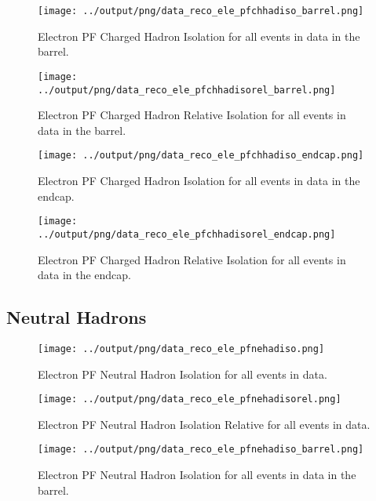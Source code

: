 \documentclass[11pt]{book}
\begin{document}
\begin{figure}[htb]
\centering
\texttt{[image: ../output/png/data\_reco\_ele\_pfchhadiso\_barrel.png]}
\caption{Electron PF Charged Hadron Isolation for all events in data in the barrel.}
\label{fig:data_ele_pfchhadiso_barrel}
\end{figure}

\begin{figure}[htb]
\centering
\texttt{[image: ../output/png/data\_reco\_ele\_pfchhadisorel\_barrel.png]}
\caption{Electron PF Charged Hadron Relative Isolation for all events in data in the barrel.}
\label{fig:data_ele_pfchhadisorel_barrel}
\end{figure}

\begin{figure}[htb]
\centering
\texttt{[image: ../output/png/data\_reco\_ele\_pfchhadiso\_endcap.png]}
\caption{Electron PF Charged Hadron Isolation for all events in data in the endcap.}
\label{fig:data_ele_pfchhadiso_endcap}
\end{figure}

\begin{figure}[htb]
\centering
\texttt{[image: ../output/png/data\_reco\_ele\_pfchhadisorel\_endcap.png]}
\caption{Electron PF Charged Hadron Relative Isolation for all events in data in the endcap.}
\label{fig:data_ele_pfchhadisorel_endcap}
\end{figure}
\clearpage

\subsection{Neutral Hadrons}
\begin{figure}[htb]
\centering
\texttt{[image: ../output/png/data\_reco\_ele\_pfnehadiso.png]}
\caption{Electron PF Neutral Hadron Isolation for all events in data.}
\label{fig:data_ele_pfnehadiso}
\end{figure}

\begin{figure}[htb]
\centering
\texttt{[image: ../output/png/data\_reco\_ele\_pfnehadisorel.png]}
\caption{Electron PF Neutral Hadron Isolation Relative for all events in data.}
\label{fig:data_ele_pfnehadisorel}
\end{figure}

\begin{figure}[htb]
\centering
\texttt{[image: ../output/png/data\_reco\_ele\_pfnehadiso\_barrel.png]}
\caption{Electron PF Neutral Hadron Isolation for all events in data in the barrel.}
\label{fig:data_ele_pfnehadiso_barrel}
\end{figure}
\end{document}
